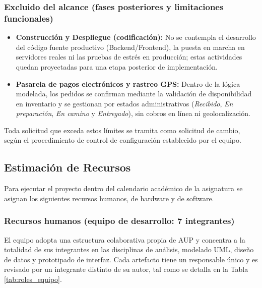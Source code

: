 \subsubsection*{Excluido del alcance (fases posteriores y limitaciones funcionales)}
\begin{itemize}
    \item \textbf{Construcción y Despliegue (codificación):} No se contempla el desarrollo del código fuente productivo (Backend/Frontend), la puesta en marcha en servidores reales ni las pruebas de estrés en producción; estas actividades quedan proyectadas para una etapa posterior de implementación.
    \item \textbf{Pasarela de pagos electrónicos y rastreo GPS:} Dentro de la lógica modelada, los pedidos se confirman mediante la validación de disponibilidad en inventario y se gestionan por estados administrativos (\textit{Recibido}, \textit{En preparación}, \textit{En camino} y \textit{Entregado}), sin cobros en línea ni geolocalización.
\end{itemize}

Toda solicitud que exceda estos límites se tramita como solicitud de cambio, según el procedimiento de control de configuración establecido por el equipo.

\subsection{Estimación de Recursos}

Para ejecutar el proyecto dentro del calendario académico de la asignatura se asignan los siguientes recursos humanos, de hardware y de software.

\subsubsection{Recursos humanos (equipo de desarrollo: 7 integrantes)}

El equipo adopta una estructura colaborativa propia de AUP y concentra a la totalidad de sus integrantes en las disciplinas de análisis, modelado UML, diseño de datos y prototipado de interfaz. Cada artefacto tiene un responsable único y es revisado por un integrante distinto de su autor, tal como se detalla en la Tabla \ref{tab:roles_equipo}.

